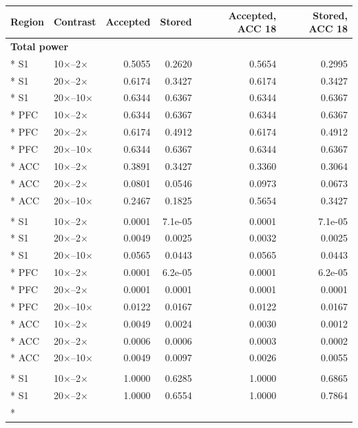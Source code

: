 \begin{longtable}{llrrrr}
\toprule
Region & Contrast & Accepted & Stored & Accepted, ACC 18 & Stored, ACC 18 \\
\midrule
\endhead
\multicolumn{6}{l}{\textbf{Total power}} \\*
S1 & 10$\times$--2$\times$ & 0.5055 & 0.2620 & 0.5654 & 0.2995 \\*
S1 & 20$\times$--2$\times$ & 0.6174 & 0.3427 & 0.6174 & 0.3427 \\*
S1 & 20$\times$--10$\times$ & 0.6344 & 0.6367 & 0.6344 & 0.6367 \\*
PFC & 10$\times$--2$\times$ & 0.6344 & 0.6367 & 0.6344 & 0.6367 \\*
PFC & 20$\times$--2$\times$ & 0.6174 & 0.4912 & 0.6174 & 0.4912 \\*
PFC & 20$\times$--10$\times$ & 0.6344 & 0.6367 & 0.6344 & 0.6367 \\*
ACC & 10$\times$--2$\times$ & 0.3891 & 0.3427 & 0.3360 & 0.3064 \\*
ACC & 20$\times$--2$\times$ & 0.0801 & 0.0546 & 0.0973 & 0.0673 \\*
ACC & 20$\times$--10$\times$ & 0.2467 & 0.1825 & 0.5654 & 0.3427 \\
\addlinespace
\multicolumn{6}{l}{\textbf{Evoked power}} \\*
S1 & 10$\times$--2$\times$ & 0.0001 & 7.1e-05 & 0.0001 & 7.1e-05 \\*
S1 & 20$\times$--2$\times$ & 0.0049 & 0.0025 & 0.0032 & 0.0025 \\*
S1 & 20$\times$--10$\times$ & 0.0565 & 0.0443 & 0.0565 & 0.0443 \\*
PFC & 10$\times$--2$\times$ & 0.0001 & 6.2e-05 & 0.0001 & 6.2e-05 \\*
PFC & 20$\times$--2$\times$ & 0.0001 & 0.0001 & 0.0001 & 0.0001 \\*
PFC & 20$\times$--10$\times$ & 0.0122 & 0.0167 & 0.0122 & 0.0167 \\*
ACC & 10$\times$--2$\times$ & 0.0049 & 0.0024 & 0.0030 & 0.0012 \\*
ACC & 20$\times$--2$\times$ & 0.0006 & 0.0006 & 0.0003 & 0.0002 \\*
ACC & 20$\times$--10$\times$ & 0.0049 & 0.0097 & 0.0026 & 0.0055 \\
\addlinespace
\multicolumn{6}{l}{\textbf{Induced power}} \\*
S1 & 10$\times$--2$\times$ & 1.0000 & 0.6285 & 1.0000 & 0.6865 \\*
S1 & 20$\times$--2$\times$ & 1.0000 & 0.6554 & 1.0000 & 0.7864 \\*

\end{longtable}
